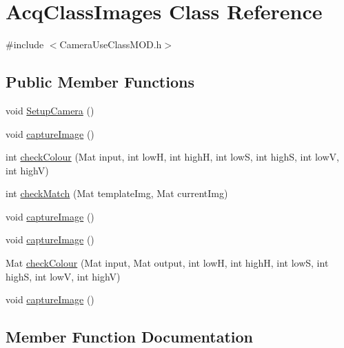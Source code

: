 \hypertarget{classAcqClassImages}{}\section{Acq\+Class\+Images Class Reference}
\label{classAcqClassImages}


{\ttfamily \#include $<$Camera\+Use\+Class\+M\+O\+D.\+h$>$}

\subsection*{Public Member Functions}
\begin{DoxyCompactItemize}
\item 
void \hyperlink{classAcqClassImages_a63b8cb9d0629de84d600277534731646}{Setup\+Camera} ()
\item 
void \hyperlink{classAcqClassImages_a482204faef78a0ef4b27bf2cb88a35bd}{capture\+Image} ()
\item 
int \hyperlink{classAcqClassImages_a3387fd6ad077a0c687c152dcfbeeb957}{check\+Colour} (Mat input, int lowH, int highH, int lowS, int highS, int lowV, int highV)
\item 
int \hyperlink{classAcqClassImages_a70c3183e628a3f196e3e688bed0935f8}{check\+Match} (Mat template\+Img, Mat current\+Img)
\item 
void \hyperlink{classAcqClassImages_a482204faef78a0ef4b27bf2cb88a35bd}{capture\+Image} ()
\item 
void \hyperlink{classAcqClassImages_a482204faef78a0ef4b27bf2cb88a35bd}{capture\+Image} ()
\item 
Mat \hyperlink{classAcqClassImages_a2369614b7db2e248f2e13309b521b53b}{check\+Colour} (Mat input, Mat output, int lowH, int highH, int lowS, int highS, int lowV, int highV)
\item 
void \hyperlink{classAcqClassImages_a482204faef78a0ef4b27bf2cb88a35bd}{capture\+Image} ()
\end{DoxyCompactItemize}


\subsection{Member Function Documentation}
\mbox{\label{classAcqClassImages_a482204faef78a0ef4b27bf2cb88a35bd}} 
